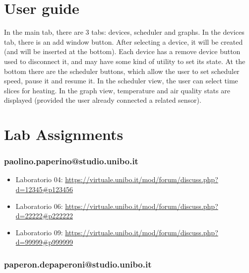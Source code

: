 \documentclass[a4paper,12pt]{report}
\begin{document}


\appendix
\chapter{User guide}

In the main tab, there are 3  tabs: devices, scheduler and graphs.
In the devices tab, there is an add window button. After selecting a device,
it will be created (and will be inserted at the bottom). Each device has a remove device button
used to disconnect it, and may have some kind of utility to set its state. \newline
At the bottom there are the scheduler buttons, which allow the user to set scheduler speed, pause it and resume it.
In the scheduler view, the user can select time slices for heating. \newline %
In the graph view, temperature and air quality stats are displayed (provided the user already connected a related sensor).


\chapter{Lab Assignments}

\subsection{paolino.paperino@studio.unibo.it}

\begin{itemize}
 \item Laboratorio 04: \url{https://virtuale.unibo.it/mod/forum/discuss.php?d=12345#p123456}
 \item Laboratorio 06: \url{https://virtuale.unibo.it/mod/forum/discuss.php?d=22222#p222222}
 \item Laboratorio 09: \url{https://virtuale.unibo.it/mod/forum/discuss.php?d=99999#p999999}
\end{itemize}

\subsection{paperon.depaperoni@studio.unibo.it}
\end{document}
